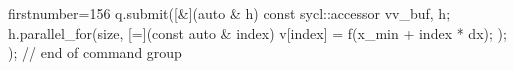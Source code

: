 \begin{cppcode*}{firstnumber=156}
        q.submit([&](auto & h) {
            const sycl::accessor v{v_buf, h};
            h.parallel_for(size, [=](const auto & index) {
                v[index] = f(x_min + index * dx);
            });
        }); // end of command group
\end{cppcode*}
